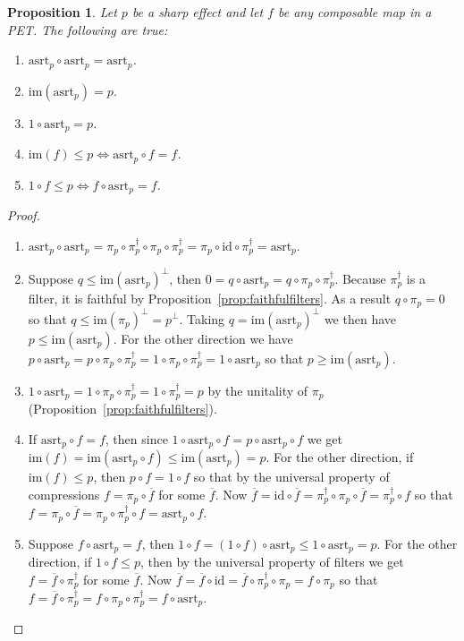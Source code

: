 \documentclass[a4paper,onecolumn,10pt,accepted=2019-05-03, issue=1, volume=1, shorttitle=papers/compositionality-1-1]{compositionalityarticle}
\newcounter{counter}
\numberwithin{counter}{section}
\newtheorem{proposition}[counter]{Proposition}
\newcommand{\asrt}{\text{asrt}}
\newcommand{\id}{\text{id}}
\newcommand{\cl}[1]{\overline{#1}}
\newcommand{\im}[1]{\text{im}(#1)}
\begin{document}
\begin{proposition} \label{prop:assertmaps}
	\cite{basthesis} Let $p$ be a sharp effect and let $f$ be any composable map in a PET. The following are true:
	\begin{enumerate}
		\item $\asrt_p\circ \asrt_p = \asrt_p$.
		\item $\im{\asrt_p} = p$.
		\item $1\circ \asrt_p = p$.
		\item $\im{f}\leq p \iff \asrt_p\circ f = f$.
		\item $1\circ f \leq p \iff f\circ \asrt_p = f$.
	\end{enumerate}
\end{proposition}
\begin{proof} ~
	\begin{enumerate}
		\item $\asrt_p\circ \asrt_p = \pi_p\circ\pi_p^\dagger\circ\pi_p\circ\pi_p^\dagger = \pi_p\circ \id\circ \pi_p^\dagger = \asrt_p$.

		\item Suppose $q\leq \im{\asrt_p}^\perp$, then $0 = q\circ \asrt_p = q\circ \pi_p\circ \pi_p^\dagger$. Because $\pi_p^\dagger$ is a filter, it is faithful by Proposition~\ref{prop:faithfulfilters}. As a result $q\circ \pi_p =0$ so that $q\leq \im{\pi_p}^\perp = p^\perp$. Taking $q=\im{\asrt_p}^\perp$ we then have $p \leq \im{\asrt_p}$. For the other direction we have $p\circ \asrt_p = p\circ \pi_p \circ \pi_p^\dagger = 1\circ \pi_p\circ \pi_p^\dagger = 1\circ \asrt_p$ so that $p\geq \im{\asrt_p}$.

		\item $1\circ \asrt_p = 1\circ \pi_p \circ \pi_p^\dagger = 1\circ \pi_p^\dagger = p$ by the unitality of $\pi_p$ (Proposition~\ref{prop:faithfulfilters}).

		\item If $\asrt_p\circ f = f$, then since $1\circ \asrt_p\circ f = p\circ \asrt_p\circ f$ we get $\im{f} = {\im{\asrt_p\circ f}} \leq \im{\asrt_p} = p$. For the other direction, if $\im{f}\leq p$, then $p\circ f = 1\circ f$ so that by the universal property of compressions $f = \pi_p\circ \cl{f}$ for some $\cl{f}$. Now $\cl{f} = \id\circ \cl{f} = \pi_p^\dagger\circ \pi_p \circ \cl{f} = \pi_p^\dagger \circ f$ so that $f = \pi_p \circ \cl{f} = \pi_p\circ \pi_p^\dagger\circ f = \asrt_p\circ f$.
		\item Suppose $f\circ \asrt_p = f$, then $1\circ f = (1\circ f)\circ \asrt_p \leq 1\circ \asrt_p = p$. For the other direction, if $1\circ f \leq p$, then by the universal property of filters we get $f = \cl{f}\circ \pi_p^\dagger$ for some $\cl{f}$. Now $\cl{f} = \cl{f}\circ \id = \cl{f} \circ \pi_p^\dagger \circ \pi_p = f \circ \pi_p$ so that $f = \cl{f}\circ \pi_p^\dagger = f\circ \pi_p\circ \pi_p^\dagger = f\circ \asrt_p$. \qedhere
	\end{enumerate}
\end{proof}
\end{document}
